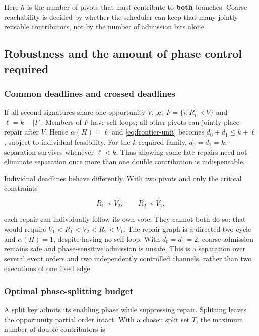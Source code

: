 Here \(h\) is the number of pivots that must contribute to \textbf{both}
branches. Coarse reachability is decided by whether the scheduler can
keep that many jointly reusable contributors, not by the number of
admission bits alone.

\subsection{Robustness and the amount of phase control
required}\label{robustness-and-the-amount-of-phase-control-required}

\subsubsection{Common deadlines and crossed
deadlines}\label{common-deadlines-and-crossed-deadlines}

If all second signatures share one opportunity \(V\), let
\(F=\{i:R_i\prec V\}\) and \(\ell=k-|F|\). Members of \(F\) have
self-loops; all other pivots can jointly place repair after \(V\). Hence
\(\alpha(H)=\ell\) and \eqref{eq:frontier-unit} becomes
\(d_0+d_1\le k+\ell\), subject to individual feasibility. For the
\(k\)-required family, \(d_0=d_1=k\): separation survives whenever
\(\ell<k\). Thus allowing some late repairs need not eliminate
separation once more than one double contribution is indispensable.

Individual deadlines behave differently. With two pivots and only the
critical constraints

\[
R_1\prec V_2,\qquad R_2\prec V_1,
\]

each repair can individually follow its own vote. They cannot both do
so: that would require \(V_1<R_1<V_2<R_2<V_1\). The repair graph is a
directed two-cycle and \(\alpha(H)=1\), despite having no self-loop.
With \(d_0=d_1=2\), coarse admission remains safe and phase-sensitive
admission is unsafe. This is a separation over several event orders and
two independently controlled channels, rather than two executions of one
fixed edge.

\subsubsection{Optimal phase-splitting
budget}\label{optimal-phase-splitting-budget}

A split key admits its enabling phase while suppressing repair.
Splitting leaves the opportunity partial order intact. With a chosen
split set \(T\), the maximum number of double contributors is

